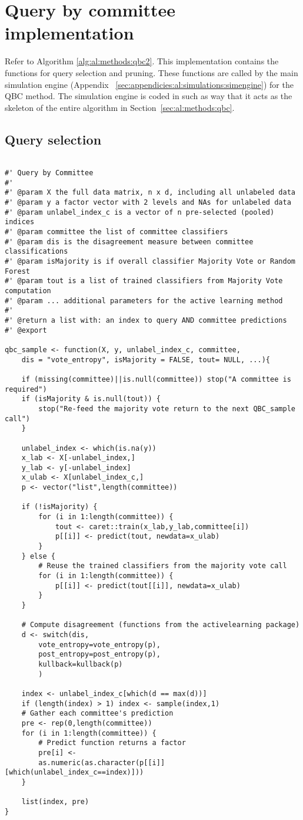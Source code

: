 \section{Query by committee implementation}
\label{sec:appendicies:al:qbc}

Refer to Algorithm \ref{alg:al:methods:qbc2}. 
This implementation contains the functions for query selection and pruning. 
These functions are called by the main simulation engine (Appendix 
~\ref{sec:appendicies:al:simulations:simengine}) for the QBC method. 
The simulation engine is coded in such as way that it acts as the skeleton 
of the entire algorithm in Section~\ref{sec:al:methods:qbc}.
\subsection{Query selection}
{
\begin{lstlisting}

#' Query by Committee
#'
#' @param X the full data matrix, n x d, including all unlabeled data
#' @param y a factor vector with 2 levels and NAs for unlabeled data
#' @param unlabel_index_c is a vector of n pre-selected (pooled) indices
#' @param committee the list of committee classifiers
#' @param dis is the disagreement measure between committee classifications
#' @param isMajority is if overall classifier Majority Vote or Random Forest
#' @param tout is a list of trained classifiers from Majority Vote computation 
#' @param ... additional parameters for the active learning method
#'
#' @return a list with: an index to query AND committee predictions
#' @export

qbc_sample <- function(X, y, unlabel_index_c, committee,
	dis = "vote_entropy", isMajority = FALSE, tout= NULL, ...){
	
	if (missing(committee)||is.null(committee)) stop("A committee is required")
	if (isMajority & is.null(tout)) {
		stop("Re-feed the majority vote return to the next QBC_sample call")
	}
	
	unlabel_index <- which(is.na(y))
	x_lab <- X[-unlabel_index,]
	y_lab <- y[-unlabel_index]
	x_ulab <- X[unlabel_index_c,]
	p <- vector("list",length(committee))
	
	if (!isMajority) {
		for (i in 1:length(committee)) {
			tout <- caret::train(x_lab,y_lab,committee[i])
			p[[i]] <- predict(tout, newdata=x_ulab)
		}
	} else {
		# Reuse the trained classifiers from the majority vote call
		for (i in 1:length(committee)) {
			p[[i]] <- predict(tout[[i]], newdata=x_ulab)
		}
	}

	# Compute disagreement (functions from the activelearning package)
	d <- switch(dis,
		vote_entropy=vote_entropy(p),
		post_entropy=post_entropy(p),
		kullback=kullback(p)
		)
	
	index <- unlabel_index_c[which(d == max(d))]
	if (length(index) > 1) index <- sample(index,1)
	# Gather each committee's prediction
	pre <- rep(0,length(committee))
	for (i in 1:length(committee)) {
		# Predict function returns a factor
		pre[i] <- 
		as.numeric(as.character(p[[i]][which(unlabel_index_c==index)]))
	}
	
	list(index, pre)
}
\end{lstlisting}
}



